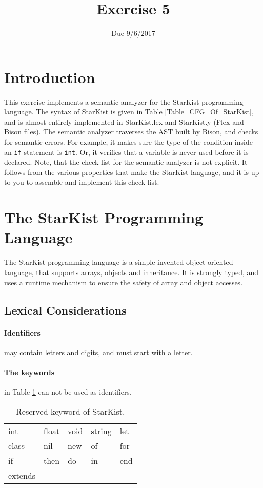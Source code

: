 \documentclass{article}
\begin{document}
\title{Exercise 5}
\date{Due 9/6/2017}
\maketitle

\section{Introduction}
This exercise implements a semantic analyzer for the StarKist
programming language.
The syntax of StarKist is given in Table \ref{Table_CFG_Of_StarKist},
and is almost entirely implemented in StarKist.lex
and StarKist.y (Flex and Bison files).
The semantic analyzer traverses the AST built by Bison,
and checks for semantic errors.
For example, it makes sure the type of the condition inside an \verb"if"
statement is \verb"int".
Or, it verifies that a variable is never used
before it is declared.
Note, that the check list for the semantic analyzer is not explicit.
It follows from the various properties that make the StarKist language,
and it is up to you to assemble and implement this check list.
\section{The StarKist Programming Language}
The StarKist programming language is a simple invented object oriented language,
that supports arrays, objects and inheritance.
It is strongly typed, and uses a runtime mechanism to ensure
the safety of array and object accesses.
\subsection{Lexical Considerations}
\paragraph{Identifiers} may contain letters and digits, and must start with a letter.
\paragraph{The keywords} in Table \ref{Table_Reserved_Keywords_of_StarKist} can not
be used as identifiers.
\begin{table}[h]
\centering
\begin{tabular}{ l l l l l}
  int     & float & void & string & let \\
  class   & nil   & new  & of     & for \\
  if      & then  & do   & in     & end \\
  extends &       &      &        &  \\
\end{tabular}
\caption{
Reserved keyword of StarKist.
\label{Table_Reserved_Keywords_of_StarKist}}
\end{table}
\end{document}
